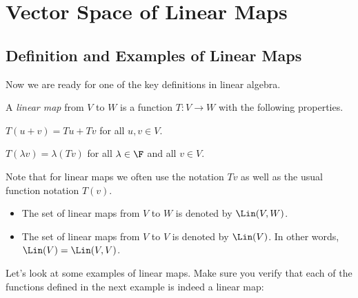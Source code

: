 \section{Vector Space of Linear Maps}

\subsection{Definition and Examples of Linear Maps}

Now we are ready for one of the key definitions in linear algebra.

\begin{definition}\label{ax:3.1}
A \emph{linear map} from $V$ to $W$ is a function $T\colon V\to W$ with the
following properties.
\begin{axprops}
\item[additivity] $T(u+v)=Tu+Tv$ for all $u,v\in V$.
\item[homogeneity] $T(\lambda v)=\lambda(Tv)$ for all $\lambda\in\F$ and all
  $v\in V$.
\end{axprops}
\end{definition}

%
Note that for linear maps we often use the notation $Tv$ as well as the usual
function notation $T(v)$.

\begin{notation}\label{ax:3.2}\leavevmode
\begin{itemize}
\item The set of linear maps from $V$ to $W$ is denoted by $\Lin(V,W)$.
\item The set of linear maps from $V$ to $V$ is denoted by $\Lin(V)$. In other
  words, $\Lin(V)=\Lin(V,V)$.
\end{itemize}
\end{notation}

Let's look at some examples of linear maps. Make sure you verify that each of
the functions defined in the next example is indeed a linear map:

